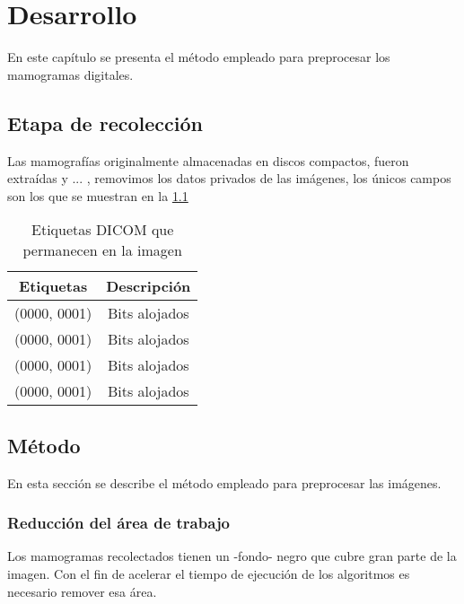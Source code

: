 \chapter{Desarrollo}
En este capítulo se presenta el método empleado para preprocesar los mamogramas
digitales.

\shorthandoff{>} 
    
\shorthandon{>} 

\section{Etapa de recolección}
Las mamografías originalmente almacenadas en discos compactos, fueron extraídas
y ... , removimos los datos privados de las imágenes, los únicos campos son los
que se muestran en la \ref{table:dicomtags} 

\begin{table}[h]
  \caption{Etiquetas DICOM que permanecen en la imagen} 
  \label{table:dicomtags}
\begin{center}
{\small
    \begin{tabular}{c|c}
    \hline

    {\bf Etiquetas} & 
    {\bf Descripción} \\
    \hline
           (0000, 0001) & Bits alojados \\
           (0000, 0001) & Bits alojados \\
           (0000, 0001) & Bits alojados \\
           (0000, 0001) & Bits alojados \\
    \hline
    \end{tabular}
}
\end{center}
\end{table}


\section{Método}
En esta sección se describe el método empleado para preprocesar las imágenes.

\subsection{Reducción del área de trabajo}
Los mamogramas recolectados tienen un -fondo- negro que cubre gran parte de la
imagen. Con el fin de acelerar el tiempo de ejecución de los algoritmos es
necesario remover esa área.

